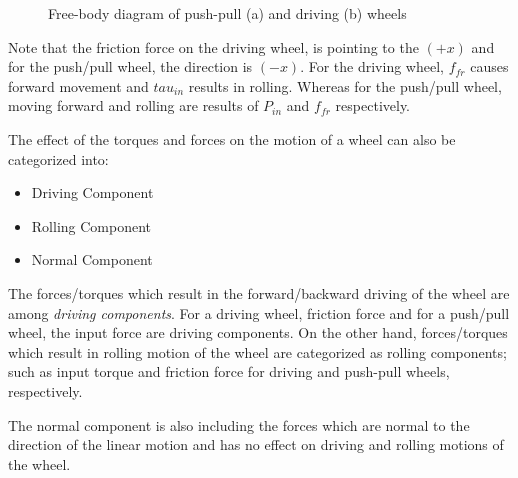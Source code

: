 \documentclass[letterpaper, 10pt, conference]{ieeeconf}
\begin{document}
\begin{figure}[!h] 
	\caption{Free-body diagram of push-pull (a) and driving (b) wheels}
	
	\label{DPW}
\end{figure}

Note that the friction force on the driving wheel, is pointing to the $(+x)$ and for the push/pull wheel, the direction is $(-x)$. For the driving wheel, $f_{fr}$ causes forward movement and $tau_{in}$ results in rolling. Whereas for the push/pull wheel, moving forward and rolling are results of $P_{in}$ and $f_{fr}$ respectively.

The effect of the torques and forces on the motion of a wheel can also be categorized into:
\begin{itemize}
\item Driving Component
\item Rolling Component
\item Normal Component
\end{itemize}

The forces/torques which result in the forward/backward driving of the wheel are among \emph{driving components}. For a driving wheel, friction force and for a push/pull wheel, the input force are driving components. On the other hand, forces/torques which result in rolling motion of the wheel are categorized as rolling components; such as input torque and friction force for driving and push-pull wheels, respectively.

The normal component is also including the forces which are normal to the direction of the linear motion and has no effect on driving and rolling motions of the wheel.
\end{document}
